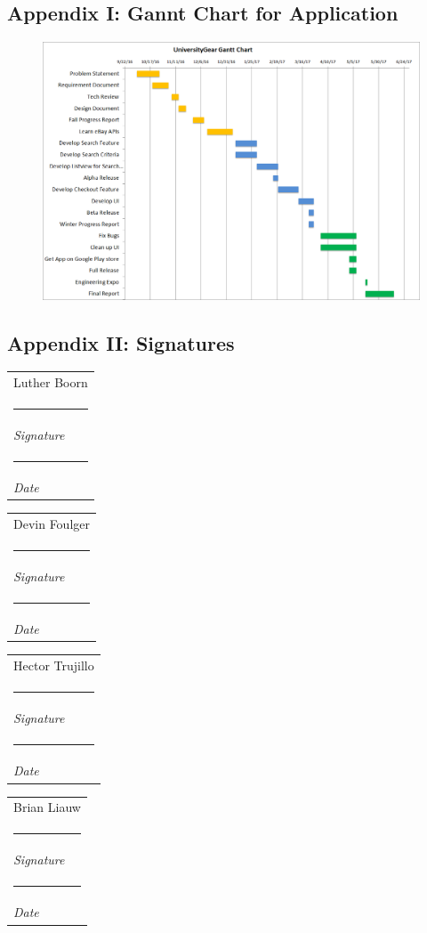 \documentclass[journal,compsoc, 10pt, draftclsnofoot, onecolumn]{IEEEtran}
\makeatletter
\newcommand{\namesigdate}[2][6cm]{%
  \begin{tabular}{@{}p{#1}@{}}
    #2 \\[0.5\normalbaselineskip] \hrule \\[0pt]
    {\small \textit{Signature}} \\[0.5\normalbaselineskip] \hrule \\[0pt]
    {\small \textit{Date}}
  \end{tabular}
}
\makeatother
\begin{document}
\subsection{Appendix I: Gannt Chart for Application}
\begin{figure}[h]
\includegraphics[scale=.5]{ganttChart} 
\centering
\end{figure}
\newpage

\subsection{Appendix II: Signatures}

\vspace{2ex}\noindent 
\namesigdate{Luther Boorn} \hfill
\namesigdate{Devin Foulger} \hfill

\vspace{4ex}\noindent
\namesigdate{Hector Trujillo} \hfill
\namesigdate{Brian Liauw} \hfill
\end{document}
